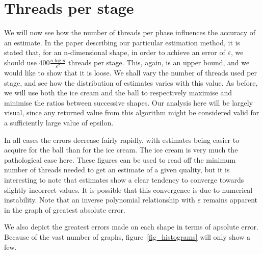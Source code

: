 \section{Threads per stage}\label{sec_error}

We will now see how the number of threads per phase influences the accuracy of an estimate. In the paper describing our particular estimation method, it is stated that, for an n-dimensional shape, in order to achieve an error of $\varepsilon$, we should use $400\frac{n\log n}{\varepsilon^2}$ threads per stage. This, again, is an upper bound, and we would like to show that it is loose. We shall vary the number of threads used per stage, and see how the distribution of estimates varies with this value. As before, we will use both the ice cream and the ball to respectively maximise and minimise the ratios between successive shapes. Our analysis here will be largely visual, since any returned value from this algorithm might be considered valid for a sufficiently large value of epsilon.

In all cases the errors decrease fairly rapidly, with estimates being easier to acquire for the ball than for the ice cream. The ice cream is very much the pathological case here. These figures can be used to read off the minimum number of threads needed to get an estimate of a given quality, but it is interesting to note that estimates show a clear tendency to converge towards slightly incorrect values. It is possible that this convergence is due to numerical instability. Note that an inverse polynomial relationship with $\varepsilon$ remains apparent in the graph of greatest absolute error.

We also depict the greatest errors made on each shape in terms of apsolute error. Because of the vast number of graphs, figure~\ref{fig_histograms} will only show a few.

